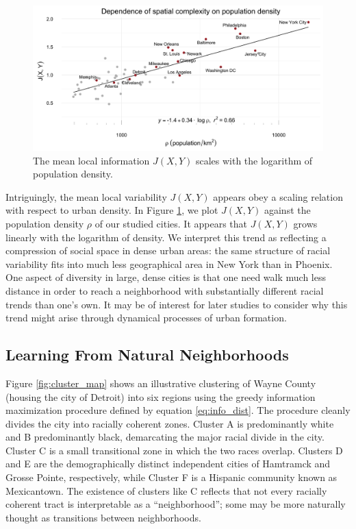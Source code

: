 	
	\begin{figure}
		\includegraphics[width=1\textwidth]{figs/density_fisher.png}
		\caption{The mean local information $J(X,Y)$ scales with the logarithm of population density.}
		\label{fig:density}
	\end{figure}	

	Intriguingly, the mean local variability $J(X,Y)$ appears obey a scaling relation with respect to urban density. In Figure \ref{fig:density}, we plot $J(X,Y)$ against the population density $\rho$ of our studied cities. It appears that $J(X,Y)$ grows linearly with the logarithm of density. We interpret this trend as reflecting a compression of social space in dense urban areas: the same structure of racial variability fits into much less geographical area in New York than in Phoenix. One aspect of diversity in large, dense cities is that one need walk much less distance in order to reach a neighborhood with substantially different racial trends than one's own. It may be of interest for later studies to consider why this trend might arise through dynamical processes of urban formation. 
	 
		

\subsection{Learning From Natural Neighborhoods}

	Figure \ref{fig:cluster_map} shows an illustrative clustering of Wayne County (housing the city of Detroit) into six regions using the greedy information maximization procedure defined by equation \eqref{eq:info_dist}. The procedure cleanly divides the city into racially coherent zones. Cluster A is predominantly white and B predominantly black, demarcating the major racial divide in the city. Cluster C is a small transitional zone in which the two races overlap. Clusters D and E are the demographically distinct independent cities of Hamtramck and Grosse Pointe, respectively, while Cluster F is a Hispanic community known as Mexicantown. The existence of clusters like C reflects that not every racially coherent tract is interpretable as a ``neighborhood''; some may be more naturally thought as transitions between neighborhoods. 
	
